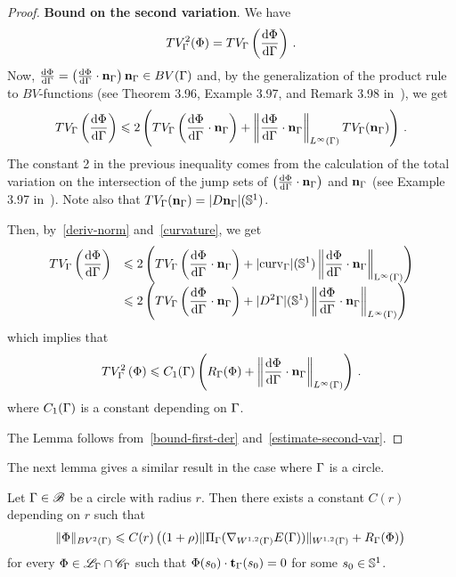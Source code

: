 \begin{proof}
{\bf Bound on the second variation}. 
We have
$$ TV^2_\Gamma(\Phi) = TV_\Gamma\left(\frac{\mathrm{d}\Phi}{\mathrm{d}\Gamma}\right)\,.$$ 
Now,  $\frac{\mathrm{d} \Phi}{\mathrm{d}\Gamma}=\left(\frac{\mathrm{d} \Phi}{\mathrm{d}\Gamma}\cdot \mathbf{n}_\Gamma\right)\mathbf{n}_\Gamma\in BV(\Gamma)$ and, by the generalization of the  product rule  to  $BV$-functions (see Theorem 3.96, Example 3.97, and Remark 3.98 in~\cite{AFP}), we get 
$$
TV_\Gamma\left(\frac{\mathrm{d} \Phi}{\mathrm{d}\Gamma}\right)\leqslant 2\left(TV_\Gamma\left(\frac{\mathrm{d} \Phi}{\mathrm{d}\Gamma}\cdot \mathbf{n}_\Gamma\right) + \left\|\frac{\mathrm{d} \Phi}{\mathrm{d}\Gamma}\cdot\mathbf{n}_\Gamma\right\|_{L^\infty(\Gamma)}TV_\Gamma(\mathbf{n}_\Gamma)\right) \,.
$$
The constant 2 in the previous inequality comes from the calculation of the total variation on the intersection of the jump sets of $\left(\frac{\mathrm{d} \Phi}{\mathrm{d}\Gamma}\cdot \mathbf{n}_\Gamma\right)$ and $\mathbf{n}_\Gamma$ (see Example 3.97 in~\cite{AFP}).
Note also that $TV_\Gamma(\mathbf{n}_\Gamma)=|D \mathbf{n}_\Gamma|(\mathbb{S}^1)$. 
\par Then, by~\eqref{deriv-norm} and~\eqref{curvature}, we get 
\begin{equation}\label{estimate-second-var0}
\begin{array}{ll}
\displaystyle{TV_\Gamma\left(\frac{\mathrm{d}\Phi}{\mathrm{d}\Gamma}\right)}&\displaystyle{\leqslant2\left(TV_\Gamma\left(\frac{\mathrm{d}\Phi}{\mathrm{d}\Gamma}\cdot \mathbf{n}_\Gamma\right) + |\rm{curv}_\Gamma|(\mathbb{S}^1)\left\| \frac{\mathrm{d}\Phi}{\mathrm{d}\Gamma}\cdot\mathbf{n}_\Gamma\right\|_{L^\infty(\Gamma)}\right)}\\
&\displaystyle{\leqslant2\left(TV_\Gamma\left(\frac{\mathrm{d}\Phi}{\mathrm{d}\Gamma}\cdot \mathbf{n}_\Gamma\right) + |D^2\Gamma|(\mathbb{S}^1)\left\| \frac{\mathrm{d}\Phi}{\mathrm{d}\Gamma}\cdot\mathbf{n}_\Gamma\right\|_{L^\infty(\Gamma)}\right)}\,\\
\end{array}
\end{equation}
which implies that 
\begin{equation}\label{estimate-second-var}
TV_\Gamma^2\left(\Phi\right)\leqslant C_1(\Gamma)\left(R_\Gamma(\Phi) + \left\|\frac{\mathrm{d} \Phi}{\mathrm{d}\Gamma}\cdot\mathbf{n}_\Gamma\right\|_{L^\infty(\Gamma)}\right)\,.\\
\end{equation}
where $C_1(\Gamma)$ is a constant depending on $\Gamma$.

The Lemma follows from~\eqref{bound-first-der} and~\eqref{estimate-second-var}.
\end{proof}

The next lemma gives a similar result in the case where $\Gamma$ is a circle.

\begin{lem}\label{lem-compacity-circle}
Let  $\Gamma\in \mathcal{B}$ be a circle with radius $r$.  Then there exists a constant $C(r)$ depending on $r$ such that 
	\begin{equation}\label{compactnessR}
	 	\|  \Phi  \|_{BV^2(\Gamma)} \leqslant 
		C(r)\left( (1+\rho) \|\Pi_\Gamma(\nabla_{W^{1,2}(\Gamma)}E(\Gamma))\|_{W^{1,2}(\Gamma)} +
R_\Gamma(\Phi)\right)\, 
	\end{equation}
	for every $\Phi \in \mathcal{L}_\Gamma \cap \mathcal{C}_\Gamma$ such that $\Phi(s_0)\cdot\mathbf{t}_\Gamma(s_0) =0$ for some $s_0\in\mathbb{S}^1$.
\end{lem}

